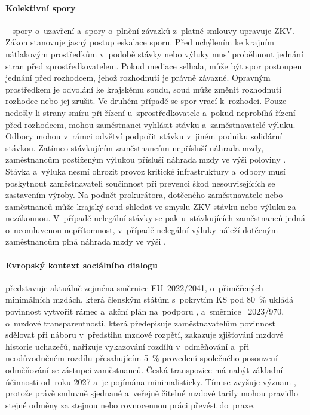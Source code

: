 

\paragraph{Kolektivní spory} -- spory o~uzavření  a~spory o~plnění závazků z~platné smlouvy upravuje \ac{ZKV}. Zákon stanovuje jasný postup eskalace sporu. Před uchýlením ke krajním nátlakovým prostředkům v~podobě stávky nebo výluky musí proběhnout jednání stran před zprostředkovatelem. Pokud mediace selhala, může být spor postoupen jednání před rozhodcem, jehož rozhodnutí je právně závazné. Opravným prostředkem je odvolání ke krajskému soudu, soud může změnit rozhodnutí rozhodce nebo jej zrušit. Ve druhém případě se spor vrací k~rozhodci. Pouze nedošly-li strany smíru při řízení u~zprostředkovatele a~pokud neprobíhá řízení před rozhodcem, mohou zaměstnanci vyhlásit stávku a~zaměstnavatelé výluku. Odbory mohou v~rámci odvětví podpořit stávku v~jiném podniku solidární stávkou. Zatímco stávkujícím zaměstnancům nepřísluší náhrada mzdy, zaměstnancům postiženým výlukou přísluší náhrada mzdy ve výši poloviny . Stávka a~výluka nesmí ohrozit provoz kritické infrastruktury a~odbory musí poskytnout zaměstnavateli součinnost při prevenci škod nesouvisejících se zastavením výroby. Na podnět prokurátora, dotčeného zaměstnavatele nebo zaměstnanců může krajský soud shledat ve smyslu \ac{ZKV} stávku nebo výluku za nezákonnou. V~případě nelegální stávky se pak u~stávkujících zaměstnanců jedná o~neomluvenou nepřítomnost, v~případě nelegální výluky náleží dotčeným zaměstnancům plná náhrada mzdy ve výši .\par



\paragraph{Evropský kontext sociálního dialogu} představuje aktuálně zejména směrnice \acs{EU}~2022/2041, o~přiměřených minimálních mzdách, která členským státům s~pokrytím \acs{KS} pod \SI{80}{\percent} ukládá povinnost vytvořit rámec a~akční plán na~podporu , a~směrnice ~2023/970, o~mzdové transparentnosti, která předepisuje zaměstnavatelům povinnost sdělovat při náboru v~předstihu mzdové rozpětí, zakazuje zjišťování mzdové historie uchazečů, nařizuje vykazování rozdílů v~odměňování a~při neodůvodněném rozdílu přesahujícím \SI{5}{\percent} provedení společného posouzení odměňování se zástupci zaměstnanců. Česká transpozice má nabýt základní účinnosti od~roku 2027 a~je pojímána minimalisticky. Tím se zvyšuje význam , protože právě smluvně sjednané a~veřejně čitelné mzdové tarify mohou pravidlo stejné odměny za stejnou nebo rovnocennou práci převést do~praxe.~\cite{ETUI_RoadTo80_Muller_2025}~\cite{Consilium_PayTransparency_2023}\par

